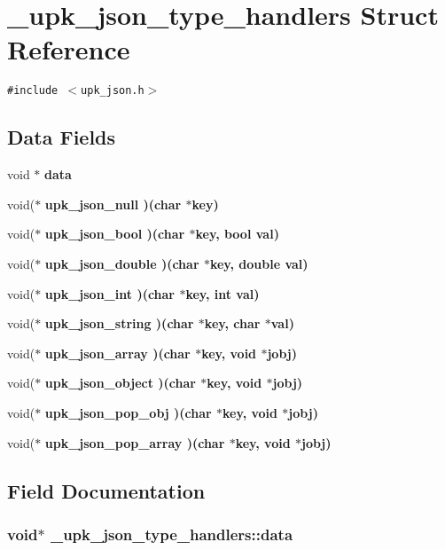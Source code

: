 \section{\_\-upk\_\-json\_\-type\_\-handlers Struct Reference}
\label{struct__upk__json__type__handlers}
{\tt \#include $<$upk\_\-json.h$>$}

\subsection*{Data Fields}
\begin{CompactItemize}
\item 
void $\ast$ \bf{data}
\item 
void($\ast$ \bf{upk\_\-json\_\-null} )(char $\ast$key)
\item 
void($\ast$ \bf{upk\_\-json\_\-bool} )(char $\ast$key, bool val)
\item 
void($\ast$ \bf{upk\_\-json\_\-double} )(char $\ast$key, double val)
\item 
void($\ast$ \bf{upk\_\-json\_\-int} )(char $\ast$key, int val)
\item 
void($\ast$ \bf{upk\_\-json\_\-string} )(char $\ast$key, char $\ast$val)
\item 
void($\ast$ \bf{upk\_\-json\_\-array} )(char $\ast$key, void $\ast$jobj)
\item 
void($\ast$ \bf{upk\_\-json\_\-object} )(char $\ast$key, void $\ast$jobj)
\item 
void($\ast$ \bf{upk\_\-json\_\-pop\_\-obj} )(char $\ast$key, void $\ast$jobj)
\item 
void($\ast$ \bf{upk\_\-json\_\-pop\_\-array} )(char $\ast$key, void $\ast$jobj)
\end{CompactItemize}


\subsection{Field Documentation}
\subsubsection{\setlength{\rightskip}{0pt plus 5cm}void$\ast$ \bf{\_\-upk\_\-json\_\-type\_\-handlers::data}}\label{struct__upk__json__type__handlers_edc0fe214fa6b408837e23bc746eabf3}


